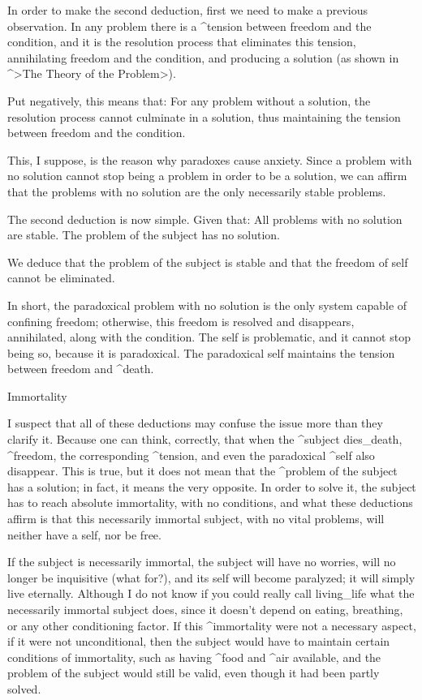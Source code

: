 In order to make the second deduction, first we need to make a previous
observation.
\beginpoints
\point In any problem there is a ^{tension} between freedom and the
condition, and it is the resolution process that eliminates this
tension, annihilating freedom and the condition, and producing a
solution (as shown in ^>The Theory of the Problem>).
\par\noindent Put negatively, this means that:
\point For any problem without a solution, the resolution process cannot
culminate in a solution, thus maintaining the tension between freedom
and the condition.
\par\noindent This, I suppose, is the reason why paradoxes cause anxiety.
Since a problem with no solution cannot stop being a problem in order to
be a solution, we can affirm that the problems with no solution are the
only necessarily stable problems.
\endpoints

The second deduction is now simple. Given that:
\beginpoints
\point All problems with no solution are stable.
\point The problem of the subject has no solution.
\par\noindent We deduce that the problem of the subject is stable and that
the freedom of self cannot be eliminated.
\endpoints

In short, the paradoxical problem with no solution is the only system
capable of confining freedom; otherwise, this freedom is resolved and
disappears, annihilated, along with the condition. The self is
problematic, and it cannot stop being so, because it is paradoxical. The
paradoxical self maintains the tension between freedom and ^{death}.


\Section Immortality

I suspect that all of these deductions may confuse the issue more than
they clarify it. Because one can think, correctly, that when the
^{subject} dies_{death}, ^{freedom}, the corresponding ^{tension}, and
even the paradoxical ^{self} also disappear. This is true, but it does
not mean that the ^{problem of the subject} has a solution; in fact, it
means the very opposite. In order to solve it, the subject has to reach
absolute immortality, with no conditions, and what these deductions
affirm is that this necessarily immortal subject, with no vital
problems, will neither have a self, nor be free.

If the subject is necessarily immortal, the subject will have no
worries, will no longer be inquisitive (what for?), and its self will
become paralyzed; it will simply live eternally. Although I do not know
if you could really call living_{life} what the necessarily immortal
subject does, since it doesn't depend on eating, breathing, or any other
conditioning factor. If this ^{immortality} were not a necessary aspect,
if it were not unconditional, then the subject would have to maintain
certain conditions of immortality, such as having ^{food} and ^{air}
available, and the problem of the subject would still be valid, even
though it had been partly solved.


